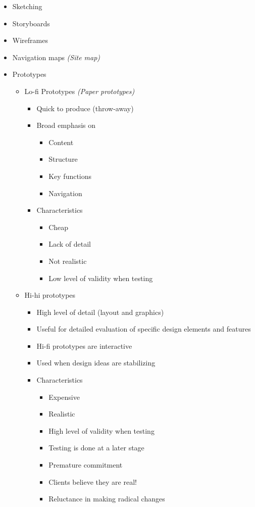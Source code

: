 \begin{itemize}
	\item Sketching
	\item Storyboards
	\item Wireframes
	\item Navigation maps \textit{(Site map)}
	\item Prototypes
	\begin{itemize}
		\item Lo-fi Prototypes \textit{(Paper prototypes)}
		\begin{itemize}
			\item Quick to produce (throw-away)
			\item Broad emphasis on
			\begin{itemize}
				\item Content
				\item Structure
				\item Key functions
				\item Navigation
			\end{itemize}
			\item Characteristics
			\begin{itemize}
				\item Cheap
				\item Lack of detail
				\item Not realistic
				\item Low level of validity when testing
			\end{itemize}
		\end{itemize}
		\item Hi-hi prototypes
		\begin{itemize}
			\item High level of detail (layout and graphics)
			\item Useful for detailed evaluation of specific design elements and features
			\item Hi-fi prototypes are interactive
			\item Used when design ideas are stabilizing
			\item Characteristics
			\begin{itemize}
				\item Expensive
				\item Realistic
				\item High level of validity when testing
				\item Testing is done at a later stage
				\item Premature commitment
				\item Clients believe they are real!
				\item Reluctance in making radical changes
			\end{itemize}
		\end{itemize}
	\end{itemize}
\end{itemize}